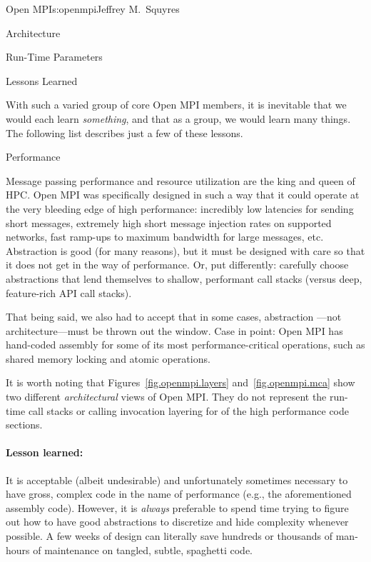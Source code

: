 \begin{aosachapter}{Open MPI}{s:openmpi}{Jeffrey M.\ Squyres}
\begin{aosasect1}{Architecture}
\begin{aosasect2}{Run-Time Parameters}
\end{aosasect2}

\end{aosasect1}


\begin{aosasect1}{Lessons Learned}

With such a varied group of core Open MPI members, it is inevitable that
we would each learn \emph{something}, and that as a group, we would
learn many things.  The following list describes just a few of these
lessons.


\begin{aosasect2}{Performance}

Message passing performance and resource utilization are the king
and queen of HPC.
%
Open MPI was specifically designed in such a way that it could operate
at the very bleeding edge of high performance: incredibly low
latencies for sending short messages, extremely high short message
injection rates on supported networks, fast ramp-ups to maximum
bandwidth for large messages, etc.
%
Abstraction is good (for many reasons), but it must be designed with
care so that it does not get in the way of performance.  Or, put
differently: carefully choose abstractions that lend themselves to
shallow, performant call stacks (versus deep, feature-rich API call
stacks).

That being said, we also had to accept that in some cases, abstraction
---not architecture---must be thrown out the window.  Case in point:
Open MPI has hand-coded assembly for some of its most
performance-critical operations, such as shared memory locking and
atomic operations.

It is worth noting that Figures~\ref{fig.openmpi.layers}
and~\ref{fig.openmpi.mca} show two different \emph{architectural} views
of Open MPI.
%
They do not represent the run-time call stacks or calling invocation
layering for of the high performance code sections.


\paragraph{Lesson learned:} 

It is acceptable (albeit undesirable) and unfortunately sometimes
necessary to have gross, complex code in the name of performance
(e.g., the aforementioned assembly code).
%
However, it is \emph{always} preferable to spend time trying to figure
out how to have good abstractions to discretize and hide complexity
whenever possible.  A few weeks of design can literally save hundreds
or thousands of man-hours of maintenance on tangled, subtle, spaghetti
code.


\end{aosasect2}
\end{aosasect1}
\end{aosachapter}
